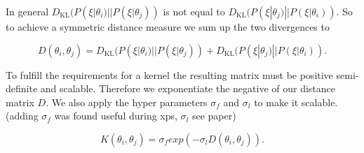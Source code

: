 In general $D_{\mathrm {KL} }(P(\xi|\theta_{ i })||P(\xi|\theta_{ j }))$ is not equal to $D_{\mathrm {KL} }(P(\xi|\theta_{ j })||P(\xi|\theta_{ i }))$. So to achieve a symmetric distance measure we sum up the two divergences to

$$D(\theta_{ i }, \theta_{ j }) = D_{\mathrm {KL} }(P(\xi|\theta_{ i })||P(\xi|\theta_{ j })) + D_{\mathrm {KL} }(P(\xi|\theta_{ j })||P(\xi|\theta_{ i })).$$

To fulfill the requirements for a kernel the resulting matrix must be positive semi-definite and scalable. Therefore we exponentiate the negative of our distance matrix $D$. We also apply the hyper parameters $\sigma_f$ and $\sigma_l$ to make it scalable\cite{wilson2014using}. (adding $\sigma_f$ was found useful during xps, $\sigma_l$  see paper)

$$K(\theta_{ i },\theta_{ j }) = \sigma_f exp(-\sigma_l D(\theta_{ i }, \theta_{ j })).$$
